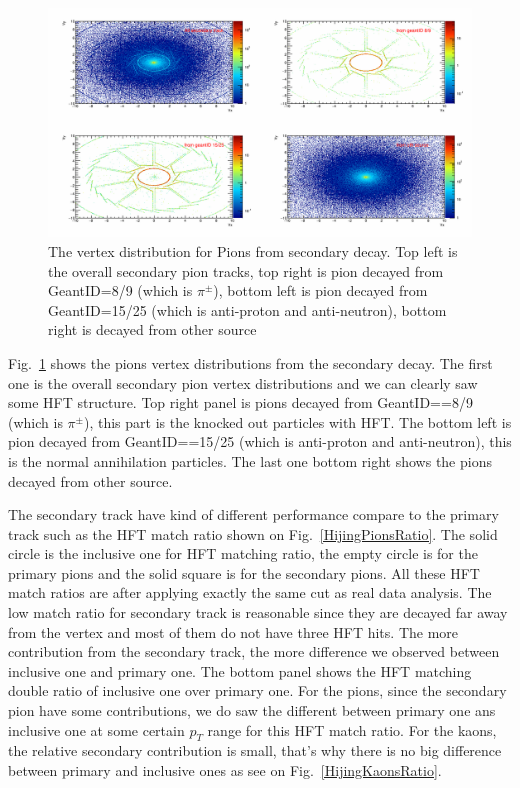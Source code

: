 \documentclass[a4paper]{article}
\begin{document}
\begin{figure}[htbp]
\centering
\includegraphics[keepaspectratio,width=1.0\textwidth,angle=0]{fig/Vtx_Pion.png}
\caption{The vertex distribution for Pions from secondary decay. Top left is the overall secondary pion tracks, top right is pion decayed from GeantID=8/9 (which is $\pi^{\pm}$), bottom left is pion decayed from GeantID=15/25 (which is anti-proton and anti-neutron), bottom right is decayed from other source}
\label{Vtx_Pion}
\end{figure}

Fig.~\ref{Vtx_Pion} shows the pions vertex distributions from the secondary decay. The first one is the overall secondary pion vertex distributions and we can clearly saw some HFT structure. Top right panel is pions decayed from GeantID==8/9 (which is $\pi^{\pm}$), this part is the knocked out particles with HFT. The bottom left is pion decayed from GeantID==15/25 (which is anti-proton and anti-neutron), this is the normal annihilation particles. The last one bottom right shows the pions decayed from other source.

The secondary track have kind of different performance compare to the primary track such as the HFT match ratio shown on Fig.~\ref{HijingPionsRatio}. The solid circle is the inclusive one for HFT matching ratio, the empty circle is for the primary pions and the solid square is for the secondary pions. All these HFT match ratios are after applying exactly the same cut as real data analysis. The low match ratio for secondary track is reasonable since they are decayed far away from the vertex and most of them do not have three HFT hits. The more contribution from the secondary track, the more difference we observed between inclusive one and primary one. The bottom panel shows the HFT matching double ratio of inclusive one over primary one. For the pions, since the secondary pion have some contributions, we do saw the different between primary one ans inclusive one at some certain $p_T$ range for this HFT match ratio. For the kaons, the relative secondary contribution is small, that's why there is no big difference between primary and inclusive ones as see on Fig.~\ref{HijingKaonsRatio}. 
\end{document}
